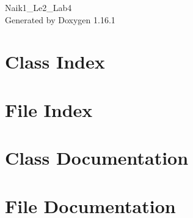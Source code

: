 \documentclass[twoside]{book}
\newcommand{\+}{\discretionary{\mbox{\scriptsize$\hookleftarrow$}}{}{}}
\newcommand{\clearemptydoublepage}{%
    \newpage{\pagestyle{empty}\cleardoublepage}%
  }
\begin{document}
  \raggedbottom
    \hypersetup{pageanchor=false,
                bookmarksnumbered=true,
                pdfencoding=unicode
               }
  \begin{titlepage}
  \vspace*{7cm}
  \begin{center}%
  {\Large Naik1\+\_\+\+Le2\+\_\+\+Lab4}\\
  \vspace*{1cm}
  {\large Generated by Doxygen 1.16.1}\\
  \end{center}
  \end{titlepage}
  \clearemptydoublepage
  \tableofcontents
  \clearemptydoublepage
  \hypersetup{pageanchor=true}
\chapter{Class Index}

\chapter{File Index}

\chapter{Class Documentation}

\chapter{File Documentation}


  \backmatter
  \newpage
  \clearemptydoublepage
  \printindex
\end{document}
